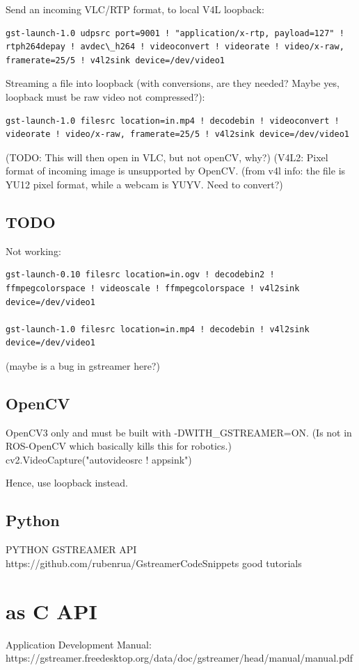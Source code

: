 \documentclass[oneside,english]{scrbook}
\begin{document}
Send an incoming VLC/RTP format, to local V4L loopback: 
\begin{lstlisting}
gst-launch-1.0 udpsrc port=9001 ! "application/x-rtp, payload=127" ! rtph264depay ! avdec\_h264 ! videoconvert ! videorate ! video/x-raw, framerate=25/5 ! v4l2sink device=/dev/video1
\end{lstlisting}

Streaming a file into loopback (with conversions, are they needed? Maybe yes, loopback must be raw video not compressed?):
\begin{lstlisting}
gst-launch-1.0 filesrc location=in.mp4 ! decodebin ! videoconvert ! videorate ! video/x-raw, framerate=25/5 ! v4l2sink device=/dev/video1
\end{lstlisting}
(TODO: This will then open in VLC, but not openCV, why?)
(V4L2: Pixel format of incoming image is unsupported by OpenCV.
(from v4l info: the file is YU12 pixel format, while a webcam is YUYV. Need to convert?)

\subsection{TODO}

Not working:
\begin{lstlisting}
gst-launch-0.10 filesrc location=in.ogv ! decodebin2 ! ffmpegcolorspace ! videoscale ! ffmpegcolorspace ! v4l2sink device=/dev/video1 

gst-launch-1.0 filesrc location=in.mp4 ! decodebin ! v4l2sink device=/dev/video1
\end{lstlisting}
(maybe is a bug in gstreamer here?)

\subsection{OpenCV}
OpenCV3 only and must be built with -DWITH_GSTREAMER=ON. (Is not in ROS-OpenCV which basically kills this for robotics.)
cv2.VideoCapture("autovideosrc ! appsink")

Hence, use loopback instead.


\subsection{Python}

PYTHON GSTREAMER API https://github.com/rubenrua/GstreamerCodeSnippets
good tutorials

\section{as C API}
Application Development Manual:  https://gstreamer.freedesktop.org/data/doc/gstreamer/head/manual/manual.pdf
\end{document}
